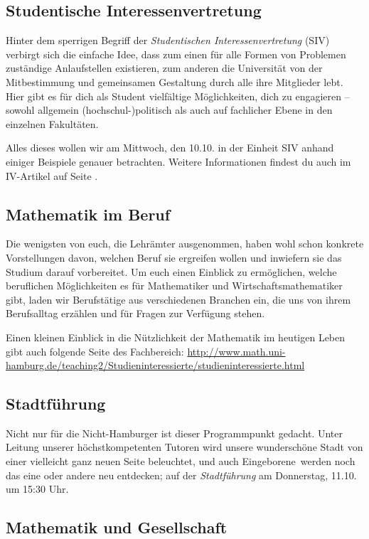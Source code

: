 \subsection*{Studentische Interessenvertretung}

Hinter dem sperrigen Begriff der \emph{Studentischen Interessenvertretung}
(SIV) verbirgt sich die einfache Idee, dass zum einen für alle Formen von
Problemen zuständige Anlaufstellen existieren, zum anderen die Universität von
der Mitbestimmung und gemeinsamen Gestaltung durch alle ihre Mitglieder lebt.
Hier gibt es für dich als Student vielfältige Möglichkeiten, dich zu engagieren
-- sowohl allgemein (hochschul-)politisch als auch auf fachlicher Ebene in den
einzelnen Fakultäten.

Alles dieses wollen wir am Mittwoch, den 10.10. in der Einheit SIV anhand
einiger Beispiele genauer betrachten. Weitere Informationen findest du auch im
IV-Artikel auf Seite \pageref{page:siv}.

\subsection*{Mathematik im Beruf}

Die wenigsten von euch, die Lehrämter ausgenommen, haben wohl schon konkrete
Vorstellungen davon, welchen Beruf sie ergreifen wollen und inwiefern sie das
Studium darauf vorbereitet. Um euch einen Einblick zu ermöglichen, welche
beruflichen Möglichkeiten es für Mathematiker und Wirtschaftsmathematiker gibt,
laden wir Berufstätige aus verschiedenen Branchen ein, die uns von ihrem
Berufsalltag erzählen und für Fragen zur Verfügung stehen.

Einen kleinen Einblick in die Nützlichkeit der Mathematik im heutigen Leben
gibt auch folgende Seite des Fachbereich:
\url{http://www.math.uni-hamburg.de/teaching2/Studieninteressierte/studieninteressierte.html}

\subsection*{Stadtführung}

Nicht nur für die Nicht-Hamburger ist dieser Programmpunkt gedacht.  Unter
Leitung unserer höchstkompetenten Tutoren wird unsere wunderschöne Stadt von
einer vielleicht ganz neuen Seite beleuchtet, und auch \glqq Eingeborene\grqq\
werden noch das eine oder andere neu entdecken; auf der \emph{Stadtführung} am
Donnerstag, 11.10. um 15:30 Uhr.

\subsection*{Mathematik und Gesellschaft}

